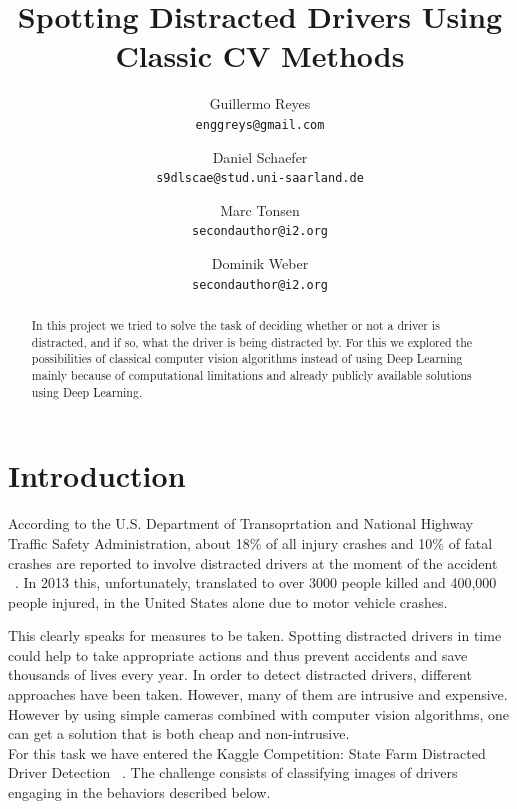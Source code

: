 \documentclass[10pt,twocolumn,letterpaper]{article}
\begin{document}
\title{Spotting Distracted Drivers Using Classic CV Methods}

\author{Guillermo Reyes\\
{\tt\small enggreys@gmail.com}
\and
Daniel Schaefer\\
{\tt\small s9dlscae@stud.uni-saarland.de}
\and
Marc Tonsen\\
{\tt\small secondauthor@i2.org}
\and
Dominik Weber\\
{\tt\small secondauthor@i2.org}
}

\maketitle

\begin{abstract}
   In this project we tried to solve the task of deciding whether or not a driver is distracted, and if so, what the driver is being distracted by. For this we explored the possibilities of classical computer vision algorithms instead of using Deep Learning mainly because of computational limitations and already publicly available solutions using Deep Learning.
\end{abstract}


\section{Introduction}


According to the U.S. Department of Transoprtation and National Highway Traffic Safety Administration, about 18\% of all injury crashes and 10\% of fatal crashes are reported to involve distracted drivers at the moment of the accident ~\cite{knuthwebsite}. In 2013 this, unfortunately, translated to over 3000 people killed and 400,000 people injured, in the United States alone due to motor vehicle crashes.

This clearly speaks for measures to be taken. Spotting distracted drivers in time could help to take appropriate actions and thus prevent accidents and save thousands of lives every year. In order to detect distracted drivers, different approaches have been taken. However, many of them are intrusive and expensive. However by using simple cameras combined with computer vision algorithms, one can get a solution that is both cheap and non-intrusive.\\

For this task we have entered the Kaggle Competition: State Farm Distracted Driver Detection ~\cite{Kaggle}. The challenge consists of classifying images of drivers engaging in the behaviors described below.
\end{document}
